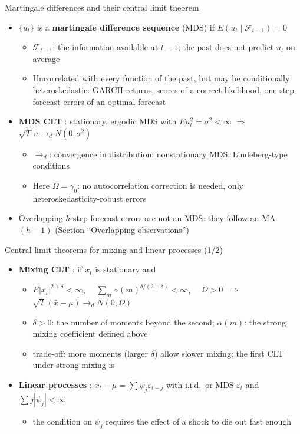\begin{frame}{Martingale differences and their central limit theorem}
\itemsize{\small}
\begin{itemize}
    \item $\{u_t\}$ is a \textbf{martingale difference sequence} (MDS) if $E(u_t \mid \mathcal{F}_{t-1}) = 0$
    \begin{itemize}
        \item $\mathcal{F}_{t-1}$: the information available at $t-1$; the past does not predict $u_t$ on average
        \item Uncorrelated with every function of the past, but may be conditionally heteroskedastic: GARCH returns, scores of a correct likelihood, one-step forecast errors of an optimal forecast
    \end{itemize}
    \item \textbf{MDS CLT} : stationary, ergodic MDS with $E u_t^2 = \sigma^2 < \infty$ $\Rightarrow$ $\sqrt{T}\,\bar u \to_d N(0, \sigma^2)$
    \begin{itemize}
        \item $\to_d$: convergence in distribution; nonstationary MDS: Lindeberg-type conditions 
        \item Here $\Omega = \gamma_0$: no autocorrelation correction is needed, only heteroskedasticity-robust errors 
    \end{itemize}
    \item Overlapping $h$-step forecast errors are not an MDS: they follow an MA$(h-1)$ (Section ``Overlapping observations'')
\end{itemize}
\end{frame}

\begin{frame}{Central limit theorems for mixing and linear processes (1/2)}
\itemsize{\small}
\begin{itemize}
    \item \textbf{Mixing CLT} : if $x_t$ is stationary and
    \begin{itemize}
        \item $E|x_t|^{2+\delta} < \infty$, $\quad \sum_m \alpha(m)^{\delta/(2+\delta)} < \infty$, $\quad \Omega > 0$ $\;\Rightarrow\;$ $\sqrt{T}(\bar x - \mu) \to_d N(0, \Omega)$
        \item $\delta > 0$: the number of moments beyond the second; $\alpha(m)$: the strong mixing coefficient defined above
        \item trade-off: more moments (larger $\delta$) allow slower mixing; the first CLT under strong mixing is 
    \end{itemize}
    \item \textbf{Linear processes} : $x_t - \mu = \sum\psi_j\varepsilon_{t-j}$ with i.i.d.\ or MDS $\varepsilon_t$ and $\sum j|\psi_j| < \infty$
    \begin{itemize}
        \item the condition on $\psi_j$ requires the effect of a shock to die out fast enough
    \end{itemize}
\end{itemize}
\end{frame}

